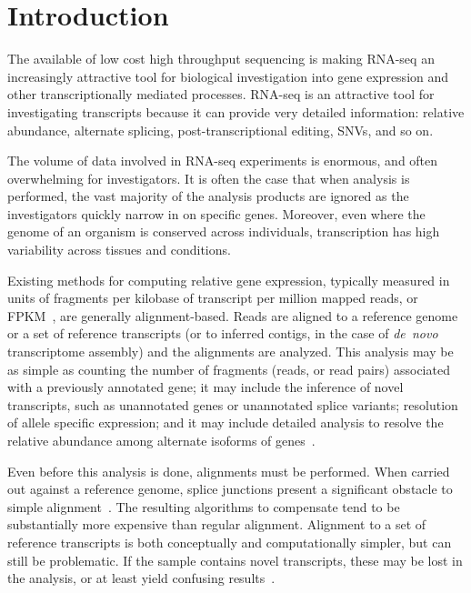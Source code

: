 \documentclass{bioinfo}
\begin{document}
\section{Introduction}
\label{sec:intro}

The available of low cost high throughput sequencing is making
RNA-seq an increasingly attractive tool for biological investigation
into gene expression and other transcriptionally mediated processes.
RNA-seq is an attractive tool for investigating transcripts
because it can provide very detailed information: relative abundance,
alternate splicing, post-transcriptional editing, SNVs, and so on.

The volume of data involved in RNA-seq experiments is enormous, and
often overwhelming for investigators.
It is often the case that when analysis is performed, the vast majority
of the analysis products are ignored as the investigators quickly
narrow in on specific genes.
Moreover, even where the genome of an organism is conserved across
individuals, transcription has high variability across tissues and
conditions.

Existing methods for computing relative gene expression, typically
measured in units of fragments per kilobase of transcript per million
mapped reads, or FPKM~\citep[see][]{Trapnell:2010}, are
generally alignment-based.
Reads are aligned to a reference genome or a set of reference
transcripts (or to inferred contigs, in the case of \textit{de~novo}
transcriptome assembly) and the alignments are analyzed.  This
analysis may be as simple as counting the number of fragments (reads,
or read pairs) associated with a previously annotated gene; it may
include the inference of novel transcripts, such as unannotated
genes or unannotated splice variants; resolution of allele specific
expression; and it may include detailed analysis to resolve the
relative abundance among alternate isoforms of
genes~\citep[e.g.][]{Jiang:2009,Li:2010}.

Even before this analysis is done, alignments must be performed.
When carried out against a reference genome, splice junctions present
a significant obstacle to simple alignment~\citep{Pepke:2009}.
The resulting algorithms to compensate tend to be substantially more
expensive than regular alignment.
Alignment to a set of reference transcripts is both conceptually
and computationally simpler, but can still be problematic.
If the sample contains novel transcripts,
these may be lost in the analysis, or at least yield confusing
results~\citep{Marioni:2008}.
\end{document}
